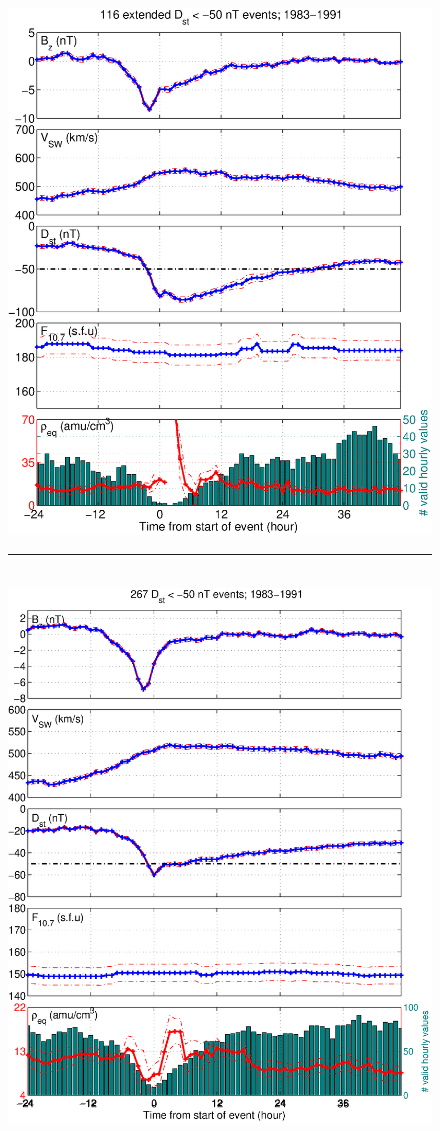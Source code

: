 \begin{figure}[tp!]
\centering
\includegraphics[scale=0.40]{2016SW001507R-p04a.eps}
\\
\rule[1ex]{5cm}{1pt}
\\
\includegraphics[scale=0.40]{2016SW001507R-p04b.eps}
\end{figure}
